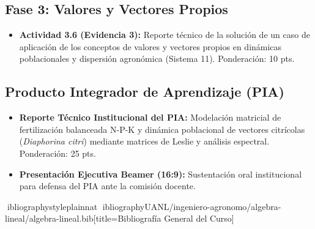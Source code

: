 \documentclass[spanish,letterpaper,oneside]{article}
\begin{document}
\subsection{Fase 3: Valores y Vectores Propios}
\begin{itemize}
  \item \textbf{Actividad 3.6 (Evidencia 3):} Reporte t\'{e}cnico de la soluci\'{o}n de un caso de aplicaci\'{o}n de los conceptos de valores y vectores propios en din\'{a}micas poblacionales y dispersi\'{o}n agron\'{o}mica (Sistema 11). Ponderaci\'{o}n: 10 pts.
\end{itemize}

\subsection{Producto Integrador de Aprendizaje (PIA)}
\begin{itemize}
  \item \textbf{Reporte T\'{e}cnico Institucional del PIA:} Modelaci\'{o}n matricial de fertilizaci\'{o}n balanceada N-P-K y din\'{a}mica poblacional de vectores citr\'{i}colas (\textit{Diaphorina citri}) mediante matrices de Leslie y an\'{a}lisis espectral. Ponderaci\'{o}n: 25 pts.
  \item \textbf{Presentaci\'{o}n Ejecutiva Beamer (16:9):} Sustentaci\'{o}n oral institucional para defensa del PIA ante la comisi\'{o}n docente.
\end{itemize}

\nocite{*}
\newpage
ibliographystyle{plainnat}
ibliography{UANL/ingeniero-agronomo/algebra-lineal/algebra-lineal.bib}[title={Bibliograf\'{i}a General del Curso}]
\end{document}
